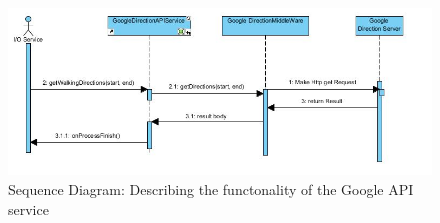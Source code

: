     \begin{figure}[htbp!]
        \centering \includegraphics[scale=0.75]{grafiken/seqDigGoogleAPI.jpg}
        \caption{Sequence Diagram: Describing the functonality of the Google API service}
        \label{fig:directionServiceSeqDiagram}
    \end{figure}
